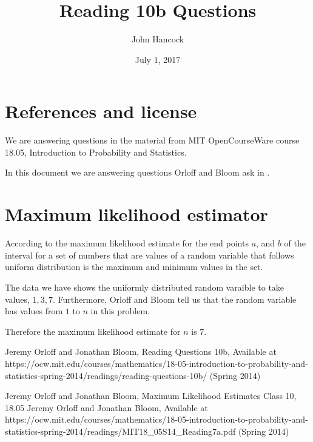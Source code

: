 \documentclass{article}
\title{Reading 10b Questions}
\author{John Hancock}
\date{July 1, 2017}
\begin{document}
\maketitle \tableofcontents
\section{References and license}
We are answering questions in the material from MIT OpenCourseWare
course 18.05, Introduction to Probability and Statistics.

In this document we are answering questions Orloff and Bloom ask in
\cite{reading10bqu}.

\section{Maximum likelihood estimator}

According to \cite{reading10b} the maximum likelihood estimate for the
end points $a$, and $b$ of the interval for a set of numbers that
are values of a random variable that follows uniform distribution is
the maximum and minimum values in the set.

The data we have shows the uniformly distributed random varaible to
take values, $1, 3, 7$.  Furthermore, Orloff and Bloom tell us that 
the random variable has values from $1$ to $n$ in this problem.

Therefore the maximum likelihood estimate for $n$ is $7$.

\begin{thebibliography}{99}
Jeremy Orloff and Jonathan Bloom,
Reading Questions 10b,
Available at https://ocw.mit.edu/courses/mathematics/18-05-introduction-to-probability-and-statistics-spring-2014/readings/reading-questions-10b/ 
(Spring 2014)

Jeremy Orloff and Jonathan Bloom,
Maximum Likelihood Estimates Class 10, 18.05
Jeremy Orloff and Jonathan Bloom,
Available at   https://ocw.mit.edu/courses/mathematics/18-05-introduction-to-probability-and-statistics-spring-2014/readings/MIT18_05S14_Reading7a.pdf
 (Spring 2014)



\end{thebibliography}
\end{document}

